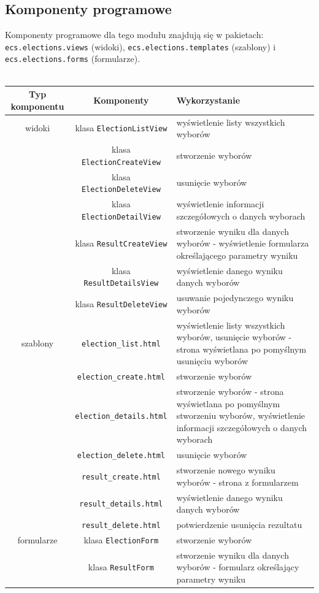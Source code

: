 \documentclass[pdflatex,11pt]{../aghdoc_version2}
\newcommand{\code}[1]{\texttt{#1}}
\begin{document}
\subsection{Komponenty programowe}
Komponenty programowe dla tego modułu znajdują się w pakietach:  \code{ecs.elections.views} (widoki), \code{ecs.elections.templates} (szablony) i \code{ecs.elections.forms} (formularze).\\ \\
\begin{tabular}{|c|c|p{6cm}|}
\hline
\textbf{Typ komponentu} & \textbf{Komponenty} & \textbf{Wykorzystanie} \\
\hline
widoki & klasa \code{ElectionListView} & wyświetlenie listy wszystkich wyborów \\
\cline{2-3}
 & klasa \code{ElectionCreateView} & stworzenie wyborów \\
\cline{2-3}
 & klasa \code{ElectionDeleteView} & usunięcie wyborów \\
\cline{2-3}
 & klasa \code{ElectionDetailView} & wyświetlenie informacji szczegółowych o
danych wyborach \\
\cline{2-3}
 & klasa \code{ResultCreateView} & stworzenie wyniku dla danych wyborów -
wyświetlenie formularza określającego
parametry wyniku \\
\cline{2-3}
 & klasa \code{ResultDetailsView} & wyświetlenie danego wyniku danych
wyborów \\
\cline{2-3}
 & klasa \code{ResultDeleteView} & usuwanie pojedynczego wyniku wyborów \\
\hline
szablony & \code{election\_list.html} & wyświetlenie listy wszystkich wyborów,
usunięcie wyborów - strona wyświetlana po pomyślnym usunięciu wyborów \\
\cline{2-3}
 & \code{election\_create.html} & stworzenie wyborów \\
\cline{2-3}
 & \code{election\_details.html} & stworzenie wyborów - strona
wyświetlana po pomyślnym stworzeniu wyborów,
wyświetlenie informacji szczegółowych o
danych wyborach \\
\cline{2-3}
 & \code{election\_delete.html} & usunięcie wyborów \\
\cline{2-3}
 & \code{result\_create.html} & stworzenie nowego wyniku wyborów -
strona z formularzem \\
\cline{2-3}
 & \code{result\_details.html} & wyświetlenie danego wyniku danych
wyborów \\
\cline{2-3}
 & \code{result\_delete.html} & potwierdzenie usunięcia rezultatu \\
\hline
formularze & klasa \code{ElectionForm} & stworzenie wyborów \\
\cline{2-3}
 & klasa \code{ResultForm} & stworzenie wyniku dla danych wyborów -
formularz określający parametry wyniku \\
\hline
\end{tabular}
\clearpage
\end{document}
